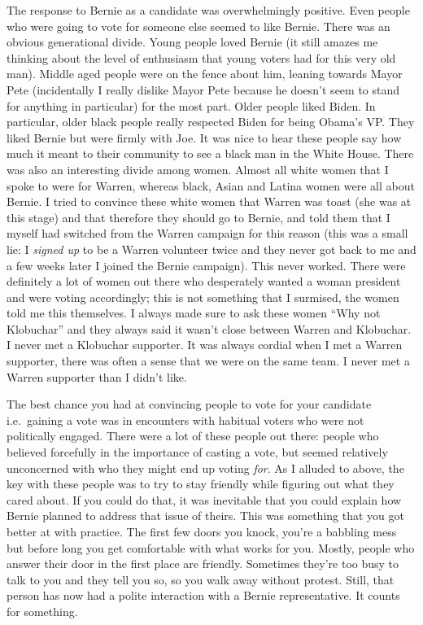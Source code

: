 \documentclass[]{book}
\begin{document}
The response to Bernie as a candidate was overwhelmingly positive. Even people who were going to vote for someone else seemed to like Bernie. There was an obvious generational divide. Young people loved Bernie (it still amazes me thinking about the level of enthusiasm that young voters had for this very old man). Middle aged people were on the fence about him, leaning towards Mayor Pete (incidentally I really dislike Mayor Pete because he doesn't seem to stand for anything in particular) for the most part. Older people liked Biden. In particular, older black people really respected Biden for being Obama's VP. They liked Bernie but were firmly with Joe. It was nice to hear these people say how much it meant to their community to see a black man in the White House. There was also an interesting divide among women. Almost all white women that I spoke to were for Warren, whereas black, Asian and Latina women were all about Bernie. I tried to convince these white women that Warren was toast (she was at this stage) and that therefore they should go to Bernie, and told them that I myself had switched from the Warren campaign for this reason (this was a small lie: I \emph{signed up} to be a Warren volunteer twice and they never got back to me and a few weeks later I joined the Bernie campaign). This never worked. There were definitely a lot of women out there who desperately wanted a woman president and were voting accordingly; this is not something that I surmised, the women told me this themselves. I always made sure to ask these women ``Why not Klobuchar'' and they always said it wasn't close between Warren and Klobuchar. I never met a Klobuchar supporter. It was always cordial when I met a Warren supporter, there was often a sense that we were on the same team. I never met a Warren supporter than I didn't like.

The best chance you had at convincing people to vote for your candidate i.e.~gaining a vote was in encounters with habitual voters who were not politically engaged. There were a lot of these people out there: people who believed forcefully in the importance of casting a vote, but seemed relatively unconcerned with who they might end up voting \emph{for}. As I alluded to above, the key with these people was to try to stay friendly while figuring out what they cared about. If you could do that, it was inevitable that you could explain how Bernie planned to address that issue of theirs. This was something that you got better at with practice. The first few doors you knock, you're a babbling mess but before long you get comfortable with what works for you. Mostly, people who answer their door in the first place are friendly. Sometimes they're too busy to talk to you and they tell you so, so you walk away without protest. Still, that person has now had a polite interaction with a Bernie representative. It counts for something.
\end{document}
